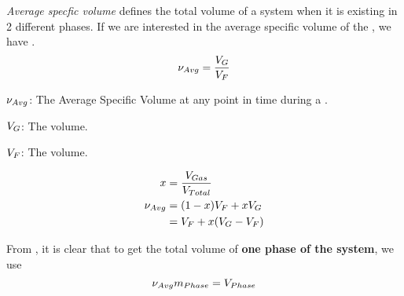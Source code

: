 \begin{definition}\label{def:Average_Specific_Volume}
  \emph{Average specfic volume} defines the total volume of a system when it is existing in 2 different phases.
  If we are interested in the average specific volume of the , we have .
  \begin{equation}\label{eq:Average_Specific_Volume}
    \nu_{Avg} = \frac{V_{G}}{V_{F}}
  \end{equation}

  \begin{description}[noitemsep]
  \item $\nu_{Avg}$: The Average Specific Volume at any point in time during a .
  \item $V_{G}$: The  volume.
  \item $V_{F}$: The  volume.
  \end{description}

  \begin{equation}\label{eq:Average_Specific_Volume_Using_Quality}
    \begin{aligned}
      x &= \frac{V_{Gas}}{V_{Total}} \\
      \nu_{Avg} &= (1 - x) V_{F} + x V_{G} \\
      &= V_{F} + x (V_{G} - V_{F})
    \end{aligned}
  \end{equation}
\end{definition}

From , it is clear that to get the total volume of \textbf{one phase of the system}, we use 
\begin{equation}\label{eq:Single_Phase_Average_Total_Volume}
  \nu_{Avg} m_{Phase} = V_{Phase}
\end{equation}


